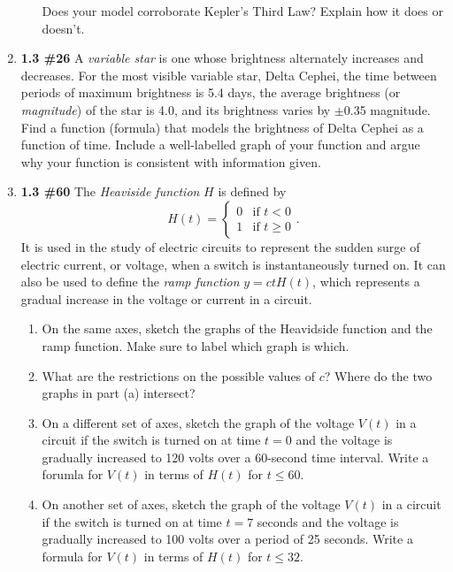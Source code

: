 \documentclass[%
]{article}
\begin{document}
\begin{enumerate}
\begin{enumerate}
	Does your model corroborate Kepler's Third Law?  Explain how it does or doesn't.
	\end{enumerate}
	
\item {\bf 1.3 \#26} A \emph{variable star} is one whose brightness alternately increases and decreases.  For the most visible variable star, Delta Cephei, the time between periods of maximum brightness is 5.4 days, the average brightness (or \emph{magnitude}) of the star is 4.0, and its brightness varies by $\pm$0.35 magnitude.  Find a function (formula) that models the brightness of Delta Cephei as a function of time.  Include a well-labelled graph of your function and argue why your function is consistent with information given.
	

\item {\bf 1.3 \#60} The \emph{Heaviside function} $H$ is defined by 
\[
H(t) = \begin{cases}
	0 & \text{if } t<0 \\
	1 & \text{if } t\geq 0
	\end{cases}.
\]  
It is used in the study of electric circuits to represent the sudden surge of electric current, or voltage, when a switch is instantaneously turned on.  It can also be used to define the \emph{ramp function} $y=ctH(t)$, which represents a gradual increase in the voltage or current in a circuit.
	\begin{enumerate}
	\item On the same axes, sketch the graphs of the Heavidside function and the ramp function.  Make sure to label which graph is which.  
	\item What are the restrictions on the possible values of $c$?  Where do the two graphs in part (a) intersect?
	\item On a different set of axes, sketch the graph of the voltage $V(t)$ in a circuit if the switch is turned on at time $t=0$ and the voltage is gradually increased to 120 volts over a 60-second time interval.  Write a forumla for $V(t)$ in terms of $H(t)$ for $t\leq 60$.
	\item On another set of axes, sketch the graph of the voltage $V(t)$ in a circuit if the switch is turned on at time $t=7$ seconds and the voltage is gradually increased to 100 volts over a period of 25 seconds.  Write a formula for $V(t)$ in terms of $H(t)$ for $t\leq 32$.
	\end{enumerate}


\end{enumerate}
\end{document}
